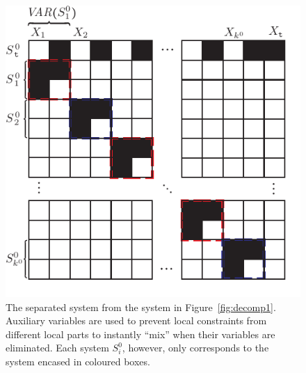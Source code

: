 \begin{figure}[htbp]
	\centering
		\includegraphics[scale = 0.8]{figures/decomp3B.pdf}
	\caption{The separated system from the system in Figure~\ref{fig:decomp1}. Auxiliary variables are used to prevent local constraints from different local parts to instantly ``mix'' when their variables are eliminated. Each system $S^0_i$, however, only corresponds to the system encased in coloured boxes.}
	\label{fig:decomp3}
\end{figure}
%
